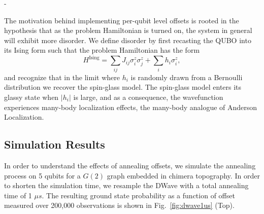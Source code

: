 -\documentclass[prd,twocolumn,tightenlines,preprintnumbers,showpacs,superscriptaddress,notitlepage,nofootinbib,eqsecnum,floatfix,longbibliography]{revtex4}
\begin{document}
The motivation behind implementing per-qubit level offsets is rooted in the hypothesis that as the problem Hamiltonian is turned on, the system in general will exhibit more disorder.
We define disorder by first recasting the QUBO into its Ising form such that the problem Hamiltonian has the form
\begin{equation}
    H^{\textrm{Ising}} = \sum_{ij} J_{ij} \sigma^z_i \sigma^z_j + \sum_i h_i \sigma^z_i,
\end{equation}
and recognize that in the limit where $h_i$ is randomly drawn from a Bernoulli distribution we recover the spin-glass model.
The spin-glass model enters its glassy state when $|h_i|$ is large, and as a consequence, the wavefunction experiences many-body localization effects, the many-body analogue of Anderson Localization.


\subsection{Simulation Results}

In order to understand the effects of annealing offsets, we simulate the annealing process on 5 qubits for a $G(2)$ graph embedded in chimera topography.
In order to shorten the simulation time, we resample the DWave with a total annealing time of 1 $\mu s$.
The resulting ground state probability as a function of offset measured over 200,000 observations is shown in Fig.~\ref{fig:dwave1us} (Top).
\end{document}
